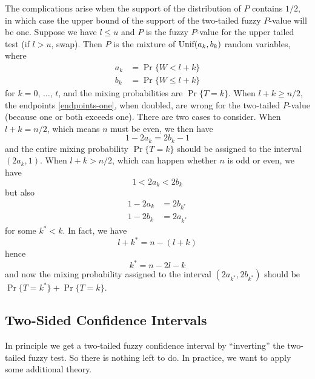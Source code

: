 \documentclass{article}
\newcommand{\UniformDis}{\text{\upshape Unif}}
\begin{document}
The complications arise when the support of the distribution of $P$ contains
$1 / 2$, in which case the upper bound of the support of the two-tailed
fuzzy $P$-value will be one.  Suppose we have $l \le u$ and $P$ is the fuzzy
$P$-value for the upper tailed test (if $l > u$, swap).  Then $P$
is the mixture of $\UniformDis(a_k, b_k)$ random variables, where
\begin{equation} \label{endpoints-one}
\begin{split}
   a_k & = \Pr\{ W < l + k \}
   \\
   b_k & = \Pr\{ W \le l + k \}
\end{split}
\end{equation}
for $k = 0$, $\ldots$, $t$, and the mixing probabilities
are $\Pr\{ T = k \}$.  When $l + k \ge n / 2$, the endpoints
\eqref{endpoints-one}, when doubled, are wrong for the two-tailed $P$-value
(because one or both exceeds one).  There are two cases to consider.
When $l + k = n / 2$, which means $n$ must be even, we then have
$$
   1 - 2 a_k = 2 b_k - 1
$$
and the entire mixing probability $\Pr\{ T = k \}$ should be assigned
to the interval $(2 a_k, 1)$.
When $l + k > n / 2$, which can happen whether $n$ is odd or even, we have
$$
   1 < 2 a_k < 2 b_k
$$
but also
\begin{align*}
   1 - 2 a_k & = 2 b_{k^*}
   \\
   1 - 2 b_k & = 2 a_{k^*}
\end{align*}
for some $k^* < k$.  In fact, we have
$$
   l + k^* = n - (l + k)
$$
hence
$$
   k^* = n - 2 l - k
$$
and now the mixing probability assigned to the
interval $(2 a_{k^*}, 2 b_{k^*})$ should be
$\Pr\{ T = k^* \} + \Pr\{ T = k \}$.

\subsection{Two-Sided Confidence Intervals}

In principle we get a two-tailed fuzzy confidence interval by ``inverting''
the two-tailed fuzzy test.  So there is nothing left to do.
In practice, we want to apply some additional theory.
\end{document}
